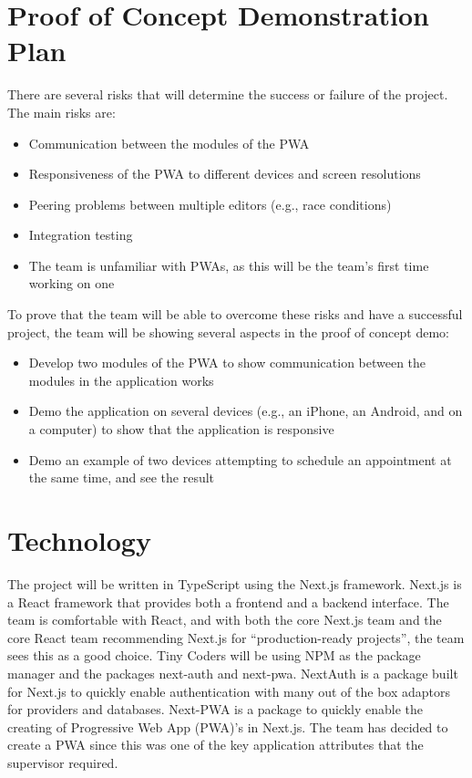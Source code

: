 \documentclass{article}
\begin{document}
\section{Proof of Concept Demonstration Plan}

There are several risks that will determine the success or failure of the project. The main risks
are:

\begin{itemize}
	\item Communication between the modules of the PWA
	\item Responsiveness of the PWA to different devices and screen resolutions
	\item Peering problems between multiple editors (e.g., race conditions)
	\item Integration testing
	\item The team is unfamiliar with PWAs, as this will be the team's first time working on one
\end{itemize}

To prove that the team will be able to overcome these risks and have a successful project, the team
will be showing several aspects in the proof of concept demo:

\begin{itemize}
	\item Develop two modules of the PWA to show communication between the modules in the application works
	\item Demo the application on several devices (e.g., an iPhone, an Android, and on a computer) to show
	      that the application is responsive
	\item Demo an example of two devices attempting to schedule an appointment at the same time, and see the
	      result
\end{itemize}

\section{Technology}

The project will be written in TypeScript using the Next.js framework. Next.js is a React framework
that provides both a frontend and a backend interface. The team is comfortable with React, and with
both the core Next.js team and the core React team recommending Next.js for ``production-ready
projects'', the team sees this as a good choice. Tiny Coders will be using NPM as the package
manager and the packages next-auth and next-pwa. NextAuth is a package built for Next.js to quickly
enable authentication with many out of the box adaptors for providers and databases. Next-PWA is a
package to quickly enable the creating of Progressive Web App (PWA)'s in Next.js. The team has
decided to create a PWA since this was one of the key application attributes that the supervisor
required.
\end{document}
